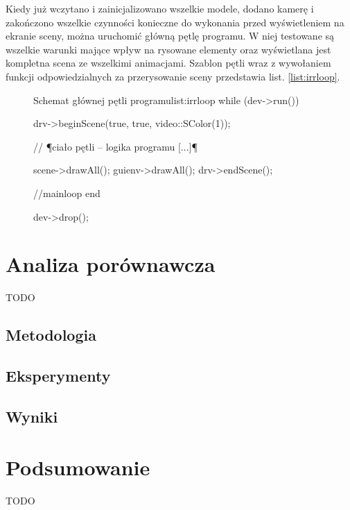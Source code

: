 \documentclass[11pt]{mwrep}
\begin{document}
Kiedy już wczytano i zainicjalizowano wszelkie modele, dodano kamerę i zakończono wszelkie czynności konieczne do wykonania przed wyświetleniem na ekranie sceny, można uruchomić główną pętlę programu. W niej testowane są wszelkie warunki mające wpływ na rysowane elementy oraz wyświetlana jest kompletna scena ze wszelkimi animacjami. Szablon pętli wraz z wywołaniem funkcji odpowiedzialnych za przerysowanie sceny przedstawia list. \ref{list:irrloop}.

\begin{figure}
\begin{listing}{Schemat głównej pętli programu}{list:irrloop}
	while (dev->run()) {
		drv->beginScene(true, true, video::SColor(1));

		// ¶ciało pętli -- logika programu [...]¶

		scene->drawAll();
		guienv->drawAll();
		drv->endScene();
	} //mainloop end

	dev->drop();

\end{listing}
\end{figure}

\chapter{Analiza porównawcza}
TODO
  \section{Metodologia}
  \section{Eksperymenty}
  \section{Wyniki}

\chapter{Podsumowanie}
TODO



\lstlistoflistings
\end{document}
